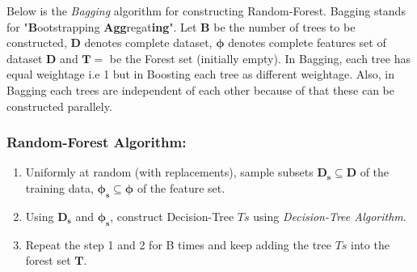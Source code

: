 \documentclass{report}
\begin{document}
Below is the \textit{Bagging} algorithm for constructing Random-Forest. Bagging stands for "\textbf{B}ootstrapping \textbf{Agg}regat\textbf{ing}".  Let \textbf{B} be the number of trees to be constructed, \textbf{D} denotes complete dataset, $\boldsymbol{\phi}$ denotes complete features set of dataset \textbf{D} and $\boldsymbol{T}={}$ be the Forest set (initially empty).  In Bagging, each tree has equal weightage i.e 1 but in Boosting each tree as different weightage. Also, in Bagging each trees are independent of each other because of that these can be constructed parallely.

\subsubsection{Random-Forest Algorithm:} \label{subsec: Random-Forest}
\begin{enumerate}
  \item Uniformly at random (with replacements), sample subsets $\boldsymbol{D_s} \subseteq \boldsymbol{D}$ of the training data, $\boldsymbol{\phi_s} \subseteq \boldsymbol{\phi}$ of the feature set. 
  \item  Using $\boldsymbol{D_s}$ and $\boldsymbol{\phi_s}$, construct Decision-Tree $Ts$ using \textit{Decision-Tree Algorithm}.
  \item Repeat the step 1 and 2 for B times and keep adding the tree $Ts$ into the forest set $\boldsymbol{T}$.
\end{enumerate}
\end{document}
